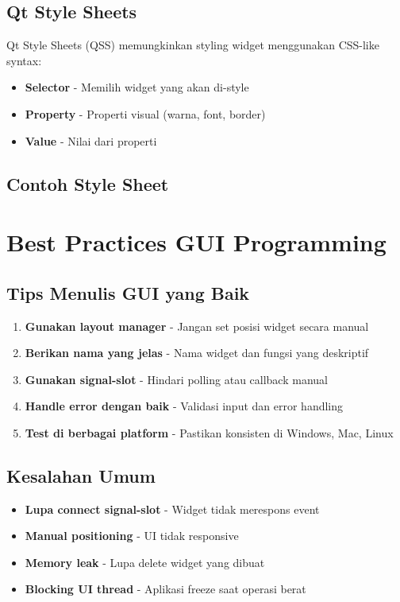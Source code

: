 \subsection{Qt Style Sheets}

Qt Style Sheets (QSS) memungkinkan styling widget menggunakan CSS-like syntax:
\begin{itemize}
\item \textbf{Selector} - Memilih widget yang akan di-style
\item \textbf{Property} - Properti visual (warna, font, border)
\item \textbf{Value} - Nilai dari properti
\end{itemize}

\subsection{Contoh Style Sheet}



\section{Best Practices GUI Programming}

\subsection{Tips Menulis GUI yang Baik}

\begin{enumerate}
\item \textbf{Gunakan layout manager} - Jangan set posisi widget secara manual
\item \textbf{Berikan nama yang jelas} - Nama widget dan fungsi yang deskriptif
\item \textbf{Gunakan signal-slot} - Hindari polling atau callback manual
\item \textbf{Handle error dengan baik} - Validasi input dan error handling
\item \textbf{Test di berbagai platform} - Pastikan konsisten di Windows, Mac, Linux
\end{enumerate}

\subsection{Kesalahan Umum}

\begin{itemize}
\item \textbf{Lupa connect signal-slot} - Widget tidak merespons event
\item \textbf{Manual positioning} - UI tidak responsive
\item \textbf{Memory leak} - Lupa delete widget yang dibuat
\item \textbf{Blocking UI thread} - Aplikasi freeze saat operasi berat
\end{itemize}


